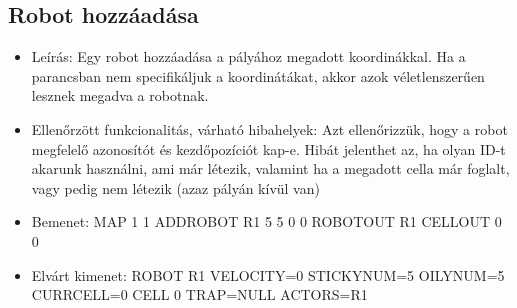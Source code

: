 
\subsection{Robot hozzáadása}
\begin{itemize}
\item Leírás: \newline
Egy robot hozzáadása a pályához megadott koordinákkal. Ha a parancsban nem specifikáljuk a koordinátákat, akkor azok véletlenszerűen lesznek megadva a robotnak.
\item Ellenőrzött funkcionalitás, várható hibahelyek: \newline
Azt ellenőrizzük, hogy a robot megfelelő azonosítót és kezdőpozíciót kap-e. Hibát jelenthet az, ha olyan ID-t akarunk használni, ami már létezik, valamint ha a megadott cella már foglalt, vagy pedig nem létezik (azaz pályán kívül van)
\item Bemenet: \newline
MAP 1 1 \newline
ADDROBOT R1 5 5 0 0 \newline
ROBOTOUT R1 \newline
CELLOUT 0 0
\item Elvárt kimenet: \newline
ROBOT R1 VELOCITY=0 STICKYNUM=5 OILYNUM=5 CURRCELL=0 \newline
CELL 0 TRAP=NULL ACTORS=R1 \newline
\end{itemize}

